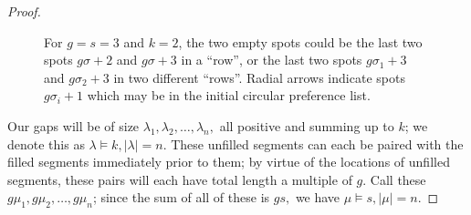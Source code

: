 \documentclass[12 pt]{amsart}
\theoremstyle{definition} %
\theoremstyle{remark} %
\newcommand{\mzncarrot}[4][(0,0)]{
    \begin{scope}[shift={#1}]
    \shade[top color=#2, bottom color=#2, shading angle=90, draw=#2!90!black, rounded corners=0.5ex, thick] (0.5,0.25) -- ++(0,1.5+.25) -- ++(0.5,0.25) -- ++(1.5,0) -- ++(1,-.5) -- ++(0,-1.45) -- cycle;
    \draw[thick, rounded corners=0.2ex, fill=white, thick] (1,2.1) -- ++(0.5,0.45) -- ++(0.8,0) -- ++(0.3,-0.45) -- cycle;
    \draw[thick] (2.1-.25,2.1) -- ++(0,.45);
    \if\relax\detokenize{#3}\relax 
    \else
    \draw[fill=#2!20, thin, draw = #2] (2.1-.25,1.3) circle[radius=.65] 
        node [anchor = center, rotate = #4]{\small #3};
    \fi
    \draw[fill=gray!80,thin] (1.375-.25,.25) circle[radius=.2];
    \draw[fill=gray!80,thin] (2.76-.25,.25) circle[radius=.2];
    \end{scope}
}
\begin{document}
\begin{proof}
\begin{figure}[h]
    
    \caption{For $g = s = 3$ and $k = 2$, the two empty spots could be the last two spots $g\sigma + 2$ and $g\sigma + 3$ in a ``row'', or the last two spots $g\sigma_1 + 3$ and $g\sigma_2 + 3$ in two different ``rows''. Radial arrows indicate spots $g\sigma_i + 1$ which may be in the initial circular preference list.}
    \label{fig:circular}
\end{figure}

    Our gaps will be of size $\lambda_1,\lambda_2,\ldots,\lambda_n,$ all positive and summing up to $k$; we denote this as $\lambda\vDash k,|\lambda|=n.$ These unfilled segments can each be paired with the filled segments immediately prior to them; by virtue of the locations of unfilled segments, these pairs will each have total length a multiple of $g.$ Call these $g\mu_1,g\mu_2,\ldots,g\mu_n$; since the sum of all of these is $gs,$ we have $\mu\vDash s,|\mu|=n.$


\end{proof}
\end{document}

